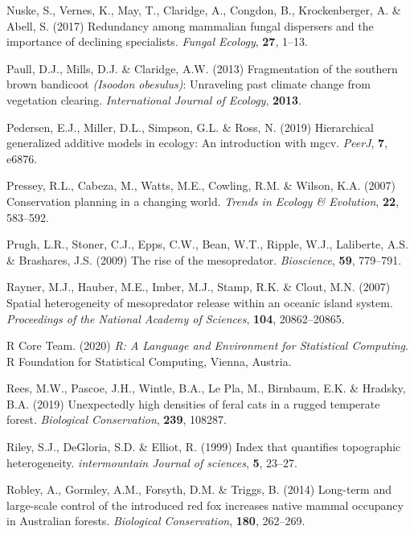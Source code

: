 \documentclass[]{elsarticle} %
\begin{document}
\leavevmode\hypertarget{ref-nuske2017redundancy}{}%
Nuske, S., Vernes, K., May, T., Claridge, A., Congdon, B., Krockenberger, A. \& Abell, S. (2017) Redundancy among mammalian fungal dispersers and the importance of declining specialists. \emph{Fungal Ecology}, \textbf{27}, 1--13.

\leavevmode\hypertarget{ref-paull2013fragmentation}{}%
Paull, D.J., Mills, D.J. \& Claridge, A.W. (2013) Fragmentation of the southern brown bandicoot \emph{(Isoodon obesulus)}: Unraveling past climate change from vegetation clearing. \emph{International Journal of Ecology}, \textbf{2013}.

\leavevmode\hypertarget{ref-pedersen2019hierarchical}{}%
Pedersen, E.J., Miller, D.L., Simpson, G.L. \& Ross, N. (2019) Hierarchical generalized additive models in ecology: An introduction with mgcv. \emph{PeerJ}, \textbf{7}, e6876.

\leavevmode\hypertarget{ref-pressey2007conservation}{}%
Pressey, R.L., Cabeza, M., Watts, M.E., Cowling, R.M. \& Wilson, K.A. (2007) Conservation planning in a changing world. \emph{Trends in Ecology \& Evolution}, \textbf{22}, 583--592.

\leavevmode\hypertarget{ref-prugh2009rise}{}%
Prugh, L.R., Stoner, C.J., Epps, C.W., Bean, W.T., Ripple, W.J., Laliberte, A.S. \& Brashares, J.S. (2009) The rise of the mesopredator. \emph{Bioscience}, \textbf{59}, 779--791.

\leavevmode\hypertarget{ref-rayner2007spatial}{}%
Rayner, M.J., Hauber, M.E., Imber, M.J., Stamp, R.K. \& Clout, M.N. (2007) Spatial heterogeneity of mesopredator release within an oceanic island system. \emph{Proceedings of the National Academy of Sciences}, \textbf{104}, 20862--20865.

\leavevmode\hypertarget{ref-R}{}%
R Core Team. (2020) \emph{R: A Language and Environment for Statistical Computing}. R Foundation for Statistical Computing, Vienna, Austria.

\leavevmode\hypertarget{ref-rees2019unexpectedly}{}%
Rees, M.W., Pascoe, J.H., Wintle, B.A., Le Pla, M., Birnbaum, E.K. \& Hradsky, B.A. (2019) Unexpectedly high densities of feral cats in a rugged temperate forest. \emph{Biological Conservation}, \textbf{239}, 108287.

\leavevmode\hypertarget{ref-riley1999index}{}%
Riley, S.J., DeGloria, S.D. \& Elliot, R. (1999) Index that quantifies topographic heterogeneity. \emph{intermountain Journal of sciences}, \textbf{5}, 23--27.

\leavevmode\hypertarget{ref-robley2014long}{}%
Robley, A., Gormley, A.M., Forsyth, D.M. \& Triggs, B. (2014) Long-term and large-scale control of the introduced red fox increases native mammal occupancy in Australian forests. \emph{Biological Conservation}, \textbf{180}, 262--269.
\end{document}

